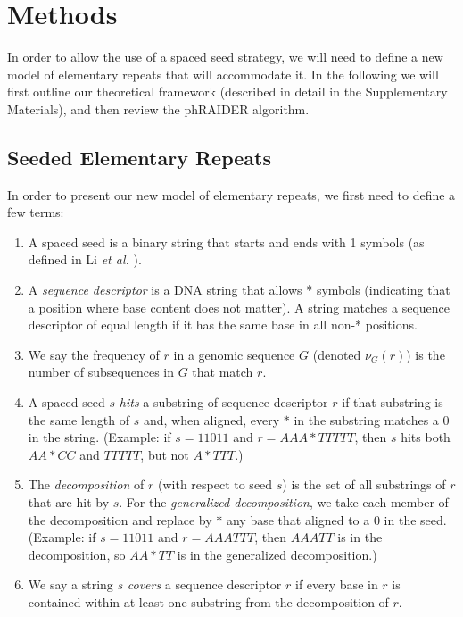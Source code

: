 \documentclass{bmcart}
\begin{document}
\section*{Methods}

In order to allow the use of a spaced seed strategy, we will need to
define a new model of elementary repeats that will accommodate it.  In
the following we will first outline our theoretical framework
(described in detail in the Supplementary Materials), and then review
the phRAIDER algorithm.

\subsection*{Seeded Elementary Repeats}
In order to present our new model of elementary repeats, we first need
to define a few terms:
\begin{enumerate}
  \item A spaced seed is a binary string that starts and ends with 1
    symbols (as defined in Li {\it et al.} \cite{Li:2004wl}).
  \item A {\it sequence descriptor} is a DNA string that allows *
    symbols (indicating that a position where base content does not
    matter).  A string matches a sequence descriptor of equal length if
    it has the same base in all non-* positions.
  \item We say the frequency of $r$ in a genomic sequence $G$ (denoted
    $\nu_G(r)$) is the number of subsequences in $G$ that match $r$.
  \item A spaced seed $s$ {\it hits} a substring of sequence
    descriptor $r$ if that substring is the same length of $s$ and,
    when aligned, every $*$ in the substring matches a 0 in the
    string.  (Example: if $s=11011$ and $r=AAA*TTTTT$, then $s$
    hits both $AA*CC$ and $TTTTT$, but not $A*TTT$.)
  \item The {\it decomposition} of $r$ (with respect to seed $s$) is
    the set of all substrings of $r$ that are hit by $s$.  For the
    {\it generalized decomposition}, we take each member of the
    decomposition and replace by $*$ any base that aligned to a 0 in
    the seed.  (Example: if $s=11011$ and $r=AAATTT$, then $AAATT$ is
    in the decomposition, so $AA*TT$ is in the generalized
    decomposition.)
  \item We say a string $s$ {\it covers} a sequence descriptor $r$ if
  every base in $r$ is contained within at least one substring from
  the decomposition of $r$.
\end{enumerate}
\end{document}
